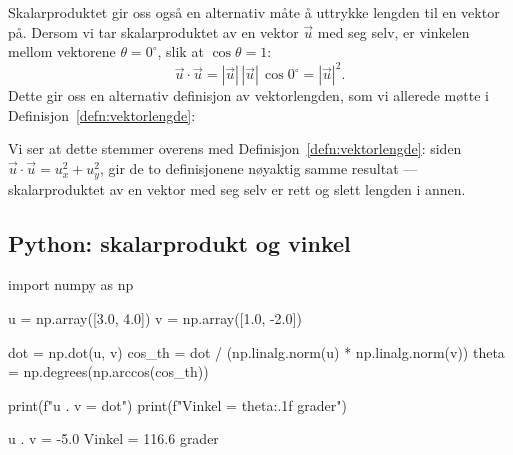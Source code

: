 
Skalarproduktet gir oss også en alternativ måte å uttrykke lengden til en vektor på. Dersom vi tar skalarproduktet av en vektor $\vec{u}$ med seg selv, er vinkelen mellom vektorene $\theta = 0^\circ$, slik at $\cos\theta = 1$:
\[
\vec{u}\cdot\vec{u} = |\vec{u}|\,|\vec{u}|\,\cos 0^\circ = |\vec{u}|^2.
\]
Dette gir oss en alternativ definisjon av vektorlengden, som vi allerede møtte i Definisjon~\ref{defn:vektorlengde}:


Vi ser at dette stemmer overens med Definisjon~\ref{defn:vektorlengde}: siden $\vec{u}\cdot\vec{u} = u_x^2+u_y^2$, gir de to definisjonene nøyaktig samme resultat --- skalarproduktet av en vektor med seg selv er rett og slett lengden i annen.

\subsection*{Python: skalarprodukt og vinkel}

\begin{pythonkode}
import numpy as np

u = np.array([3.0,  4.0])
v = np.array([1.0, -2.0])

dot    = np.dot(u, v)
cos_th = dot / (np.linalg.norm(u) * np.linalg.norm(v))
theta  = np.degrees(np.arccos(cos_th))

print(f"u . v  = {dot}")
print(f"Vinkel = {theta:.1f} grader")
\end{pythonkode}
\begin{pythonoutput}
u . v  = -5.0
Vinkel = 116.6 grader
\end{pythonoutput}


